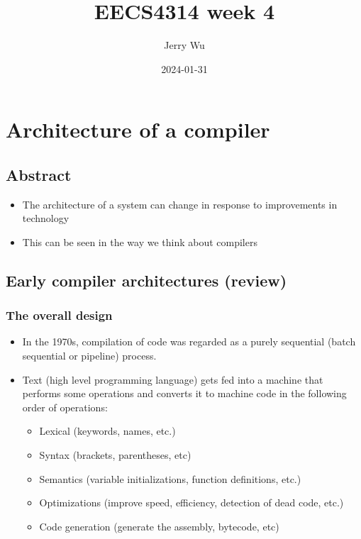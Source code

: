 \documentclass[12pt]{book}
\title{EECS4314 week 4}
\author{Jerry Wu}
\date{2024-01-31}
\begin{document}
\maketitle
\tableofcontents

\chapter{Architecture of a compiler}

\section{Abstract}
\begin{itemize}
    \item The architecture of a system can change in response to improvements in technology
    \item This can be seen in the way we think about compilers
\end{itemize}

\section{Early compiler architectures (review)}

\subsection{The overall design}

\begin{itemize}
    \item In the 1970s, compilation of code was regarded as a purely sequential (batch sequential or pipeline) process.
    \item Text (high level programming language) gets fed into a machine that performs some operations and converts it to machine code in the following order of operations:
    \begin{itemize}
        \item Lexical (keywords, names, etc.)
        \item Syntax (brackets, parentheses, etc)
        \item Semantics (variable initializations, function definitions, etc.)
        \item Optimizations (improve speed, efficiency, detection of dead code, etc.)
        \item Code generation (generate the assembly, bytecode, etc)
    \end{itemize}
\end{itemize}
\end{document}
